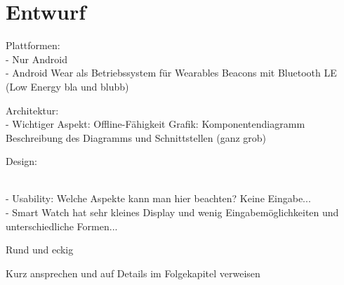\section{Entwurf}
Plattformen:
\\- Nur Android
\\- Android Wear als Betriebssystem für Wearables
Beacons mit Bluetooth LE (Low Energy bla und blubb)


Architektur:
\\- Wichtiger Aspekt: Offline-Fähigkeit
Grafik: Komponentendiagramm
Beschreibung des Diagramms und Schnittstellen (ganz grob)

Design:

\\- Usability: Welche Aspekte kann man hier beachten? Keine Eingabe...
\\- Smart Watch hat sehr kleines Display und wenig Eingabemöglichkeiten und unterschiedliche Formen...

Rund und eckig

Kurz ansprechen und auf Details im Folgekapitel verweisen